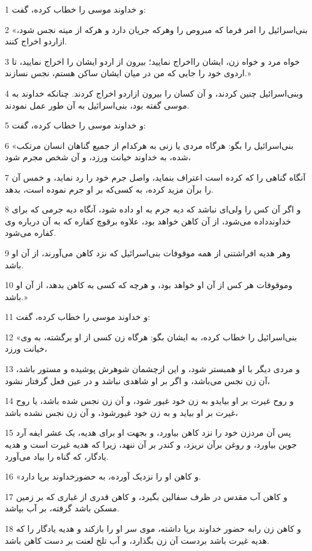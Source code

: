 \par 1 و خداوند موسی را خطاب کرده، گفت:
\par 2 «بنی‌اسرائیل را امر فرما که مبروص را وهرکه جریان دارد و هرکه از میته نجس شود، ازاردو اخراج کنند.
\par 3 خواه مرد و خواه زن، ایشان رااخراج نمایید؛ بیرون از اردو ایشان را اخراج نمایید، تا اردوی خود را جایی که من در میان ایشان ساکن هستم، نجس نسازند.»
\par 4 وبنی‌اسرائیل چنین کردند، و آن کسان را بیرون ازاردو اخراج کردند. چنانکه خداوند به موسی گفته بود، بنی‌اسرائیل به آن طور عمل نمودند.
\par 5 و خداوند موسی را خطاب کرده، گفت:
\par 6 «بنی‌اسرائیل را بگو: هرگاه مردی یا زنی به هرکدام از جمیع گناهان انسان مرتکب شده، به خداوند خیانت ورزد، و آن شخص مجرم شود،
\par 7 آنگاه گناهی را که کرده است اعتراف بنماید، واصل جرم خود را رد نماید، و خمس آن را برآن مزید کرده، به کسی‌که بر او جرم نموده است، بدهد.
\par 8 و اگر آن کس را ولی‌ای نباشد که دیه جرم به او داده شود، آنگاه دیه جرمی که برای خداوندداده می‌شود، از آن کاهن خواهد بود، علاوه برقوچ کفاره که به آن درباره وی کفاره می‌شود.
\par 9 وهر هدیه افراشتنی از همه موقوفات بنی‌اسرائیل که نزد کاهن می‌آورند، از آن او باشد. 
\par 10 وموقوفات هر کس از آن او خواهد بود، و هرچه که کسی به کاهن بدهد، از آن او باشد.»
\par 11 و خداوند موسی را خطاب کرده، گفت:
\par 12 «بنی‌اسرائیل را خطاب کرده، به ایشان بگو: هرگاه زن کسی از او برگشته، به وی خیانت ورزد،
\par 13 و مردی دیگر با او همبستر شود، و این ازچشمان شوهرش پوشیده و مستور باشد، آن زن نجس می‌باشد، و اگر بر او شاهدی نباشد و در عین فعل گرفتار نشود،
\par 14 و روح غیرت بر او بیایدو به زن خود غیور شود، و آن زن نجس شده باشد، یا روح غیرت بر او بیاید و به زن خود غیورشود، و آن زن نجس نشده باشد،
\par 15 پس آن مردزن خود را نزد کاهن بیاورد، و بجهت او برای هدیه، یک عشر ایفه آرد جوین بیاورد، و روغن برآن نریزد، و کندر بر آن ننهد، زیرا که هدیه غیرت است و هدیه یادگار، که گناه را بیاد می‌آورد.
\par 16 «و کاهن او را نزدیک آورده، به حضورخداوند برپا دارد.
\par 17 و کاهن آب مقدس در ظرف سفالین بگیرد، و کاهن قدری از غباری که بر زمین مسکن باشد گرفته، بر آب بپاشد.
\par 18 و کاهن زن رابه حضور خداوند برپا داشته، موی سر او را بازکند و هدیه یادگار را که هدیه غیرت باشد بردست آن زن بگذارد، و آب تلخ لعنت بر دست کاهن باشد.
